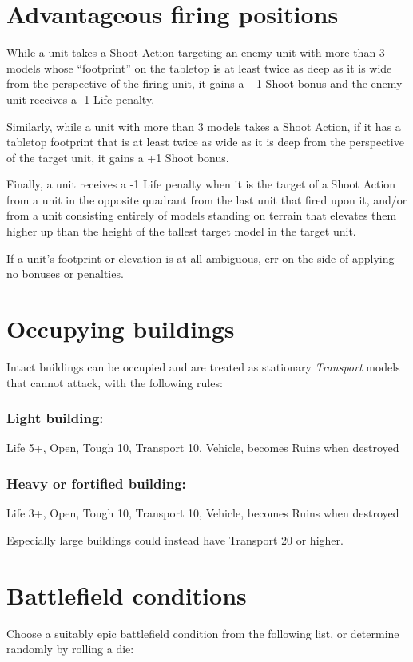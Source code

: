 \begin{multicols}{2}
\section*{Advantageous firing positions}
While a unit takes a Shoot Action targeting an enemy unit with more than 3 models whose ``footprint'' on the tabletop is at least twice as deep as it is wide from the perspective of the firing unit, it gains a +1 Shoot bonus and the enemy unit receives a -1 Life penalty.

Similarly, while a unit with more than 3 models takes a Shoot Action, if it has a tabletop footprint that is at least twice as wide as it is deep from the perspective of the target unit, it gains a +1 Shoot bonus.

Finally, a unit receives a -1 Life penalty when it is the target of a Shoot Action from a unit in the opposite quadrant from the last unit that fired upon it, and/or from a unit consisting entirely of models standing on terrain that elevates them higher up than the height of the tallest target model in the target unit.

If a unit's footprint or elevation is at all ambiguous, err on the side of applying no bonuses or penalties.




\section*{Occupying buildings}
Intact buildings can be occupied and are treated as stationary \textit{Transport} models that cannot attack, with the following rules:

\subsubsection*{Light building:} Life 5+, Open, Tough 10, Transport 10, Vehicle, becomes Ruins when destroyed

\subsubsection*{Heavy or fortified building:} Life 3+, Open, Tough 10, Transport 10, Vehicle, becomes Ruins when destroyed

Especially large buildings could instead have Transport 20 or higher.




\section*{Battlefield conditions}
Choose a suitably epic battlefield condition from the following list, or determine randomly by rolling a die:


\end{multicols}
